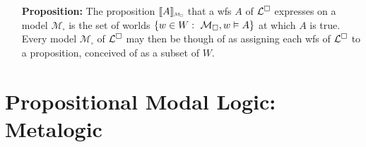 \documentclass[a4paper, 11pt]{article} %
\begin{document}
\begin{enumerate}[leftmargin=1.2in]
\begin{small}
\begin{itemize}[leftmargin=.36in]
		      \end{itemize}
	      \end{small}
	\item[\bf Proposition:] The proposition $\interpret{A}_{\Scale[0.5]{\mathcal{M}_\square}}$ that a wfs ${A}$ of $\mathcal{L}^{\square}$ expresses on a model $\mathcal{M}_\square$ is the set of worlds $\lbrace w\in W: ~\mathcal{M}_\square,w\vDash  A\rbrace$ at which ${A}$ is true. Every model $\mathcal{M}_\square$ of $\mathcal{L}^{\square}$ may then be though of as assigning each wfs of $\mathcal{L}^{\square}$ to a proposition, conceived of as a subset of $W$.
\end{enumerate}




\section*{\sc Propositional Modal Logic: Metalogic}
\end{document}

